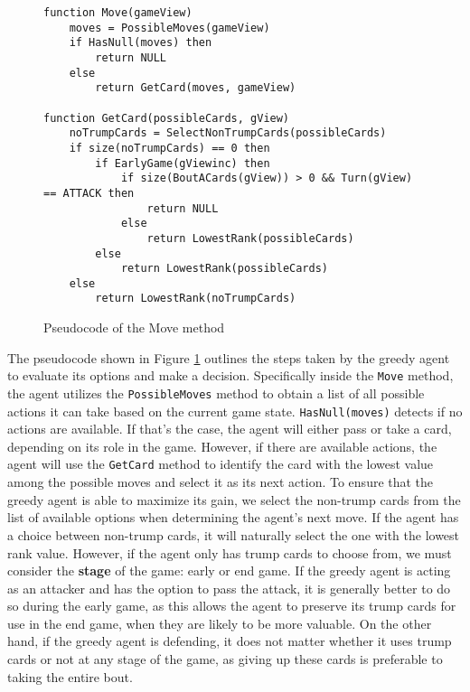 \begin{figure}[h]
\captionsetup{justification=centering}
\begin{lstlisting}
function Move(gameView)
	moves = PossibleMoves(gameView)
	if HasNull(moves) then
		return NULL
	else
		return GetCard(moves, gameView)

function GetCard(possibleCards, gView)
	noTrumpCards = SelectNonTrumpCards(possibleCards)
	if size(noTrumpCards) == 0 then
		if EarlyGame(gViewinc) then
			if size(BoutACards(gView)) > 0 && Turn(gView) == ATTACK then
				return NULL
			else
				return LowestRank(possibleCards)
		else
			return LowestRank(possibleCards)
	else
		return LowestRank(noTrumpCards)
\end{lstlisting}
\caption{Pseudocode of the Move method}
\label{fig:greedyMove}
\end{figure}

The pseudocode shown in Figure \ref{fig:greedyMove} outlines the steps taken by the greedy agent to evaluate its options and make a decision. Specifically inside the \texttt{Move} method, the agent utilizes the \texttt{PossibleMoves} method to obtain a list of all possible actions it can take based on the current game state. \texttt{HasNull(moves)} detects if no actions are available. If that's the case, the agent will either pass or take a card, depending on its role in the game. However, if there are available actions, the agent will use the \texttt{GetCard} method to identify the card with the lowest value among the possible moves and select it as its next action. To ensure that the greedy agent is able to maximize its gain, we select the non-trump cards from the list of available options when determining the agent's next move. If the agent has a choice between non-trump cards, it will naturally select the one with the lowest rank value. However, if the agent only has trump cards to choose from, we must consider the \textbf{stage} of the game: early or end game. If the greedy agent is acting as an attacker and has the option to pass the attack, it is generally better to do so during the early game, as this allows the agent to preserve its trump cards for use in the end game, when they are likely to be more valuable. On the other hand, if the greedy agent is defending, it does not matter whether it uses trump cards or not at any stage of the game, as giving up these cards is preferable to taking the entire bout.

